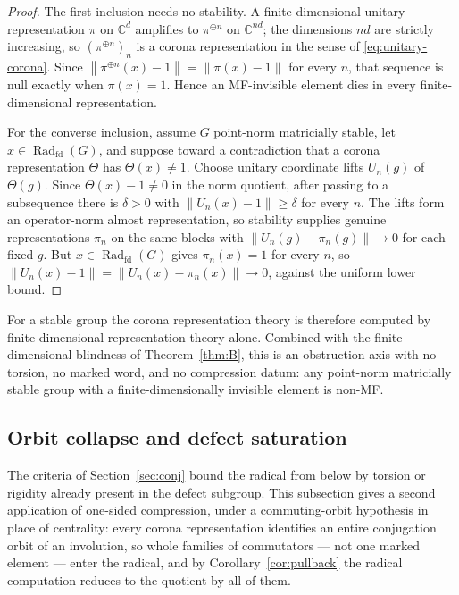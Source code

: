 \documentclass[11pt]{amsart}
\theoremstyle{definition}
\theoremstyle{remark}
\theoremstyle{plain}
\newcommand{\C}{\mathbb C}
\newcommand{\opnorm}[1]{\left\lVert #1\right\rVert}
\begin{document}
\begin{proof}
The first inclusion needs no stability.  A finite-dimensional unitary
representation $\pi$ on $\C^{d}$ amplifies to $\pi^{\oplus n}$ on
$\C^{nd}$; the dimensions $nd$ are strictly increasing, so
$(\pi^{\oplus n})_n$ is a corona representation in the sense of
\eqref{eq:unitary-corona}.  Since
$\opnorm{\pi^{\oplus n}(x)-1}=\opnorm{\pi(x)-1}$ for every $n$, that
sequence is null exactly when $\pi(x)=1$.  Hence an MF-invisible
element dies in every finite-dimensional representation.

For the converse inclusion, assume $G$ point-norm matricially stable,
let $x\in\operatorname{Rad}_{\mathrm{fd}}(G)$, and suppose toward a
contradiction that a corona representation $\Theta$ has
$\Theta(x)\ne1$.  Choose unitary coordinate lifts $U_n(g)$ of
$\Theta(g)$.  Since $\Theta(x)-1\ne0$ in the norm quotient, after
passing to a subsequence there is $\delta>0$ with
$\opnorm{U_n(x)-1}\ge\delta$ for every $n$.  The lifts form an
operator-norm almost representation, so stability supplies genuine
representations $\pi_n$ on the same blocks with
$\opnorm{U_n(g)-\pi_n(g)}\to0$ for each fixed $g$.  But
$x\in\operatorname{Rad}_{\mathrm{fd}}(G)$ gives $\pi_n(x)=1$ for every
$n$, so
$\opnorm{U_n(x)-1}=\opnorm{U_n(x)-\pi_n(x)}\to0$, against the uniform
lower bound.
\end{proof}

For a stable group the corona representation theory is therefore
computed by finite-dimensional representation theory alone.  Combined
with the finite-dimensional blindness of Theorem~\ref{thm:B}, this is
an obstruction axis with no torsion, no marked word, and no
compression datum: any point-norm matricially stable group with a
finite-dimensionally invisible element is non-MF.

\subsection{Orbit collapse and defect saturation}\label{subsec:collapse}

The criteria of Section~\ref{sec:conj} bound the radical from below
by torsion or rigidity already present in the defect subgroup.  This
subsection gives a second application of one-sided compression, under
a commuting-orbit hypothesis in place of centrality: every corona
representation identifies an entire conjugation orbit of an
involution, so whole families of commutators --- not one marked
element --- enter the radical, and by Corollary~\ref{cor:pullback}
the radical computation reduces to the quotient by all of them.
\end{document}
